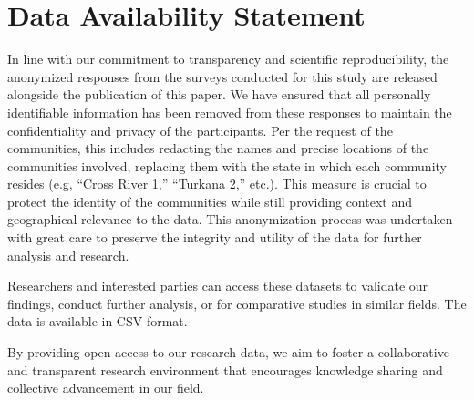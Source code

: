 \section*{Data Availability Statement}
In line with our commitment to transparency and scientific reproducibility, the anonymized responses from the surveys conducted for this study are released alongside the publication of this paper. We have ensured that all personally identifiable information has been removed from these responses to maintain the confidentiality and privacy of the participants. Per the request of the communities, this includes redacting the names and precise locations of the communities involved, replacing them with the state in which each community resides (e.g, ``Cross River 1,'' ``Turkana 2,'' etc.). This measure is crucial to protect the identity of the communities while still providing context and geographical relevance to the data. This anonymization process was undertaken with great care to preserve the integrity and utility of the data for further analysis and research.

Researchers and interested parties can access these datasets to validate our findings, conduct further analysis, or for comparative studies in similar fields. The data is available in CSV format.

By providing open access to our research data, we aim to foster a collaborative and transparent research environment that encourages knowledge sharing and collective advancement in our field.